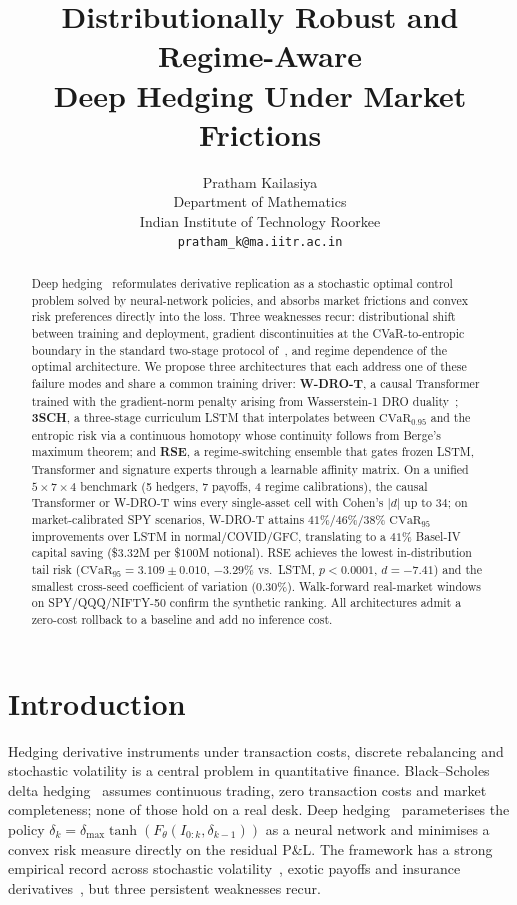 \documentclass[11pt]{article}
\title{\bfseries Distributionally Robust and Regime-Aware\\
Deep Hedging Under Market Frictions}
\author{Pratham Kailasiya \\
Department of Mathematics \\
Indian Institute of Technology Roorkee \\
\texttt{pratham\_k@ma.iitr.ac.in}}
\date{}
\newcommand{\cvar}{\mathrm{CVaR}}
\begin{document}
\maketitle

\begin{abstract}
Deep hedging~\citep{buehler2019deep} reformulates derivative replication as a stochastic optimal control problem solved by neural-network policies, and absorbs market frictions and convex risk preferences directly into the loss.  Three weaknesses recur: distributional shift between training and deployment, gradient discontinuities at the CVaR-to-entropic boundary in the standard two-stage protocol of~\citet{kozyra2019deep}, and regime dependence of the optimal architecture.  We propose three architectures that each address one of these failure modes and share a common training driver: \textbf{W-DRO-T}, a causal Transformer trained with the gradient-norm penalty arising from Wasserstein-1 DRO duality~\citep{blanchet2019quantifying}; \textbf{3SCH}, a three-stage curriculum LSTM that interpolates between $\cvar_{0.95}$ and the entropic risk via a continuous homotopy whose continuity follows from Berge's maximum theorem; and \textbf{RSE}, a regime-switching ensemble that gates frozen LSTM, Transformer and signature experts through a learnable affinity matrix.  On a unified $5\times 7\times 4$ benchmark (5 hedgers, 7 payoffs, 4 regime calibrations), the causal Transformer or W-DRO-T wins every single-asset cell with Cohen's $|d|$ up to $34$; on market-calibrated SPY scenarios, W-DRO-T attains $41\%/46\%/38\%$ $\cvar_{95}$ improvements over LSTM in normal/COVID/GFC, translating to a $41\%$ Basel-IV capital saving (\$$3.32$M per \$$100$M notional).  RSE achieves the lowest in-distribution tail risk ($\cvar_{95}=3.109\pm 0.010$, $-3.29\%$ vs.\ LSTM, $p<0.0001$, $d=-7.41$) and the smallest cross-seed coefficient of variation ($0.30\%$).  Walk-forward real-market windows on SPY/QQQ/NIFTY-50 confirm the synthetic ranking.  All architectures admit a zero-cost rollback to a baseline and add no inference cost.
\end{abstract}

\section{Introduction}

Hedging derivative instruments under transaction costs, discrete rebalancing and stochastic volatility is a central problem in quantitative finance.  Black--Scholes delta hedging~\citep{black1973pricing} assumes continuous trading, zero transaction costs and market completeness; none of those hold on a real desk.  Deep hedging~\citep{buehler2019deep} parameterises the policy $\delta_k = \delta_{\max}\tanh(F_\theta(I_{0:k}, \delta_{k-1}))$ as a neural network and minimises a convex risk measure directly on the residual P\&L.  The framework has a strong empirical record across stochastic volatility~\citep{horvath2021deep}, exotic payoffs and insurance derivatives~\citep{carbonneau2021deep}, but three persistent weaknesses recur.
\end{document}
